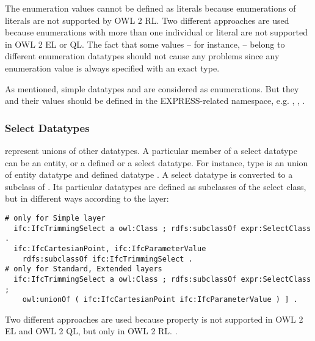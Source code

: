 The enumeration values cannot be defined as literals because enumerations of literals are not supported by OWL 2 RL. Two different approaches are used because enumerations with more than one individual or literal are not supported in OWL 2 EL or QL. The fact that some values -- for instance,  -- belong to different enumeration data\-types should not cause any problems since any enumeration value is always specified with an exact type. 

As mentioned, simple data\-types  and  are considered as enumerations. But they and their values should be defined in the EXPRESS-related namespace, e.g. , , .



\subsubsection{Select Datatypes} represent unions of other data\-types. A particular member of a select data\-type can be an entity, or a defined or a select data\-type. For instance, type  is an union of entity data\-type  and defined data\-type . A select data\-type is converted to a subclass of . Its particular data\-types are defined as subclasses of the select class, but in different ways according to the layer:

\begin{lstlisting}
# only for Simple layer
  ifc:IfcTrimmingSelect a owl:Class ; rdfs:subclassOf expr:SelectClass .
  ifc:IfcCartesianPoint, ifc:IfcParameterValue
    rdfs:subclassOf ifc:IfcTrimmingSelect .
# only for Standard, Extended layers
  ifc:IfcTrimmingSelect a owl:Class ; rdfs:subclassOf expr:SelectClass ;
    owl:unionOf ( ifc:IfcCartesianPoint ifc:IfcParameterValue ) ] .
\end{lstlisting}

Two different approaches are used because property  is not supported in OWL 2 EL and OWL 2 QL, but only in OWL 2 RL. \cite{motik2012owl}.




